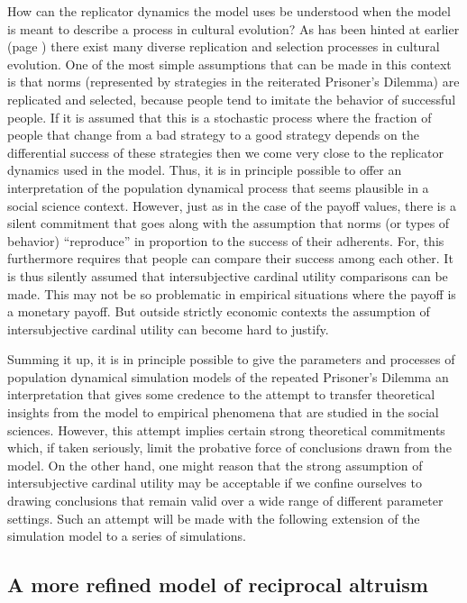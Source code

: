 How can the replicator dynamics the model uses be understood when the model is
meant to describe a process in cultural evolution? As has been hinted at
earlier (page \pageref{reproductionInCulturalEvolution}) there exist many
diverse replication and selection processes in cultural evolution. One of the
most simple assumptions that can be made in this context is that norms
(represented by strategies in the reiterated Prisoner's Dilemma) are
replicated and selected, because people tend to imitate the behavior of
successful people. If it is assumed that this is a stochastic process where the
fraction of people that change from a bad strategy to a good strategy depends
on the differential success of these strategies then we come very close to the
replicator dynamics used in the model. Thus, it is in principle
possible to offer an interpretation of the population dynamical process that
seems plausible in a social science context. However, just as in the
case of the payoff values, there is a silent commitment that goes along with
the assumption that norms (or types of behavior) ``reproduce'' in proportion
to the success of their adherents. For, this furthermore requires that people
can compare their success among each other. It is thus silently assumed that
intersubjective cardinal utility comparisons can be made. This may not be so
problematic in empirical situations where the payoff is a monetary payoff. But
outside strictly economic contexts the assumption of intersubjective cardinal
utility can become hard to justify.

Summing it up, it is in principle possible to give the parameters and
processes of population dynamical simulation models of the repeated Prisoner's
Dilemma an interpretation that gives some credence to the attempt to transfer
theoretical insights from the model to empirical phenomena that are studied 
in the social sciences. However, this
attempt implies certain strong theoretical commitments which, if taken
seriously, limit the probative force of conclusions drawn from the model.  On
the other hand, one might reason that the strong assumption of intersubjective
cardinal utility may be acceptable if we confine ourselves to drawing
conclusions that remain valid over a wide range of different parameter
settings. Such an attempt will be made with the following extension of the
simulation model to a series of simulations.

\subsection{A more refined model of reciprocal altruism}

